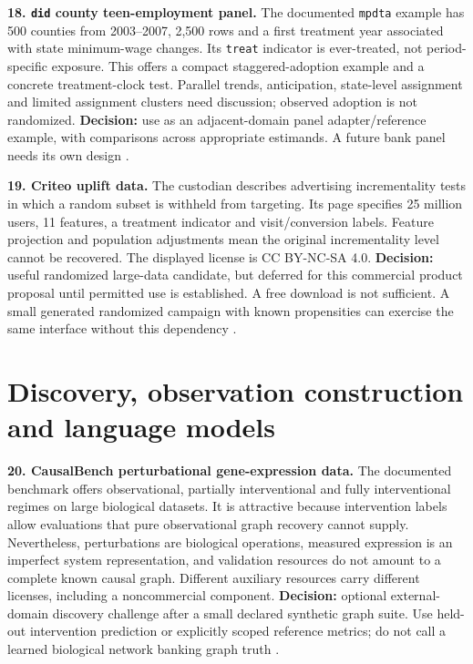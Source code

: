 \textbf{18. \texttt{did} county teen-employment panel.} The documented
\texttt{mpdta} example has 500 counties from 2003--2007, 2,500 rows and
a first treatment year associated with state minimum-wage changes. Its
\texttt{treat} indicator is ever-treated, not period-specific exposure.
This offers a compact staggered-adoption example and a concrete
treatment-clock test. Parallel trends, anticipation, state-level
assignment and limited assignment clusters need discussion; observed
adoption is not randomized. \textbf{Decision:} use as an adjacent-domain
panel adapter/reference example, with comparisons across appropriate
estimands. A future bank panel needs its own design \citep{pd15_mpdta}.

\textbf{19. Criteo uplift data.} The custodian describes advertising
incrementality tests in which a random subset is withheld from
targeting. Its page specifies 25 million users, 11 features, a treatment
indicator and visit/conversion labels. Feature projection and population
adjustments mean the original incrementality level cannot be recovered.
The displayed license is CC BY-NC-SA 4.0. \textbf{Decision:} useful
randomized large-data candidate, but deferred for this commercial
product proposal until permitted use is established. A free download is
not sufficient. A small generated randomized campaign with known
propensities can exercise the same interface without this dependency
\citep{pd15_criteo}.

\hypertarget{discovery-observation-construction-and-language-models}{%
\section{Discovery, observation construction and language
models}\label{discovery-observation-construction-and-language-models}}

\textbf{20. CausalBench perturbational gene-expression data.} The
documented benchmark offers observational, partially interventional and
fully interventional regimes on large biological datasets. It is
attractive because intervention labels allow evaluations that pure
observational graph recovery cannot supply. Nevertheless, perturbations
are biological operations, measured expression is an imperfect system
representation, and validation resources do not amount to a complete
known causal graph. Different auxiliary resources carry different
licenses, including a noncommercial component. \textbf{Decision:}
optional external-domain discovery challenge after a small declared
synthetic graph suite. Use held-out intervention prediction or
explicitly scoped reference metrics; do not call a learned biological
network banking graph truth \citep{pd15_causalbench_pinned}.

